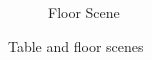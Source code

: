 \begin{figure}[htbp]
\begin{subfigure}{0.49\textwidth}
        \caption{Floor Scene} \label{fig:floor}
    \end{subfigure}%
    \hspace*{\fill}   %


\caption{ Table and floor scenes \label{fig:scenes}}
\end{figure}

